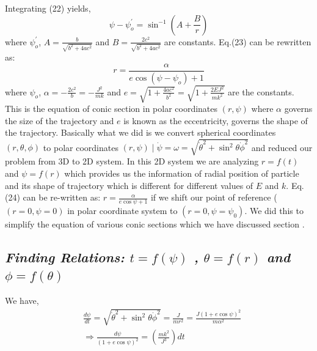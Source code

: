 \documentclass[conference]{IEEEtran}
\newcommand{\RomanNumeralCaps}[1]{\MakeUppercase{\romannumeral #1}}
\begin{document}
Integrating (22) yields, \begin{dmath}
    \psi - \psi_{o}^{'} = \sin^{-1}{\left(A + \frac{B}{r}\right)}
\end{dmath} where $\psi_{o}^{'}$, $A = \frac{b}{\sqrt{b^{2} + 4ac^{2}}}$ and $B = \frac{2c^{2}}{\sqrt{b^{2} + 4ac^{2}}}$ are constants. Eq.(23) can be rewritten as: \begin{dmath}r = \frac{\alpha}{e\cos \left(\psi - \psi_{o}\right) + 1}\end{dmath} where $\psi_{o}$, $\alpha = -\frac{2c^{2}}{b} = -\frac{J^{2}}{mk}$ and $e = \sqrt{1 + \frac{4ac^{2}}{b^{2}}} = \sqrt{1 + \frac{2EJ^{2}}{mk^{2}}}$ are the constants. This is the equation of conic section in polar coordinates $(r, \psi)$ where $\alpha$ governs the size of the trajectory and $e$ is known as the eccentricity, governs the shape of the trajectory. Basically what we did is we convert spherical coordinates $(r,\theta,\phi)$ to polar coordinates $(r,\psi) \mid \dot{\psi} = \omega = \sqrt{\dot{\theta}^{2} + \sin^2{\theta}\dot{\phi}^{2}}$ and reduced our problem from 3D to 2D system. In this 2D system we are analyzing $r = f(t)$ and $\psi = f(r)$ which provides us the information of radial position of particle and its shape of trajectory which is different for different values of $E$ and $k$. Eq. (24) can be re-written as: $r = \frac{\alpha}{e\cos{\psi}+1}$ if we shift our point of reference ($(r = 0,\psi = 0)$ in polar coordinate system  to $(r = 0,\psi = \psi_{0})$. We did this to simplify the equation of various conic sections which we have discussed section \RomanNumeralCaps{6}.
\vspace{1em}




\subsection{\normalsize{\emph{\textbf{Finding Relations: $t = f(\psi)$ , $\theta = f(r)$ and $\phi = f(\theta)$}}}}
We have, \begin{equation}
\begin{split}
&\frac{d \psi}{d t} = \sqrt{\dot{\theta}^{2} + \sin^{2}{\theta}\dot{\phi}^{2}} = \frac{J}{mr^{2}} = \frac{J\left(1 + e\cos{\psi}\right)^{2}}{m\alpha^{2}} \\
&\Rightarrow \frac{d \psi}{\left(1 + e\cos{\psi}\right)^{2}} = \left(\frac{mk^{2}}{J^{3}}\right) dt 
\end{split}
\end{equation}
\end{document}

